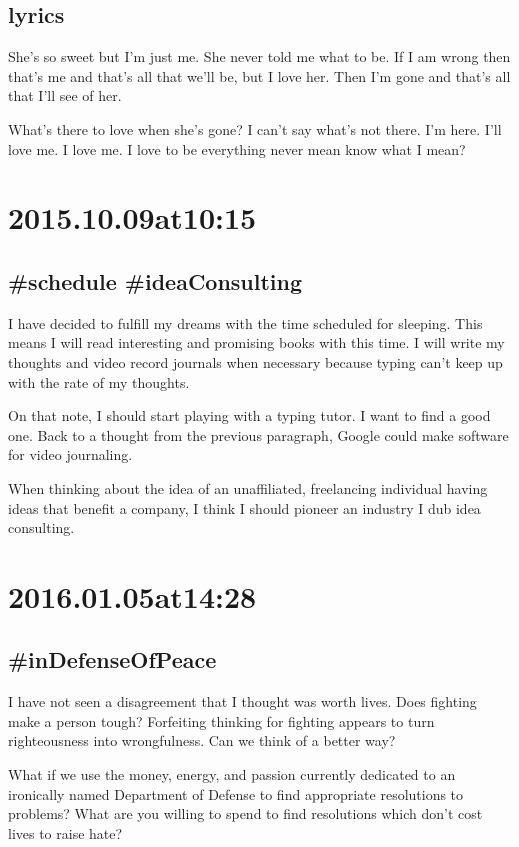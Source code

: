 \subsection*{lyrics}
She's so sweet but I'm just me.
She never told me what to be.
If I am wrong then that's me and that's all that we'll be, but I love her.
Then I'm gone and that's all that I'll see of her.

What's there to love when she's gone?
I can't say what's not there.
I'm here.
I'll love me.
I love me.
I love to be
everything
never mean
know what I mean?

\section*{2015.10.09at10:15}
\subsection*{ #schedule #ideaConsulting }
I have decided to fulfill my dreams with the time scheduled for sleeping. This means I will read interesting and promising books with this time. I will write my thoughts and video record journals when necessary because typing can't keep up with the rate of my thoughts.

On that note, I should start playing with a typing tutor. I want to find a good one. Back to a thought from the previous paragraph, Google could make software for video journaling.

When thinking about the idea of an unaffiliated, freelancing individual having ideas that benefit a company, I think I should pioneer an industry I dub idea consulting.

\section*{ 2016.01.05at14:28 }
\subsection*{ #inDefenseOfPeace }

I have not seen a disagreement that I thought was worth lives. Does fighting make a person tough? Forfeiting thinking for fighting appears to turn righteousness into wrongfulness. Can we think of a better way?

What if we use the money, energy, and passion currently dedicated to an ironically named Department of Defense to find appropriate resolutions to problems? What are you willing to spend to find resolutions which don't cost lives to raise hate?

